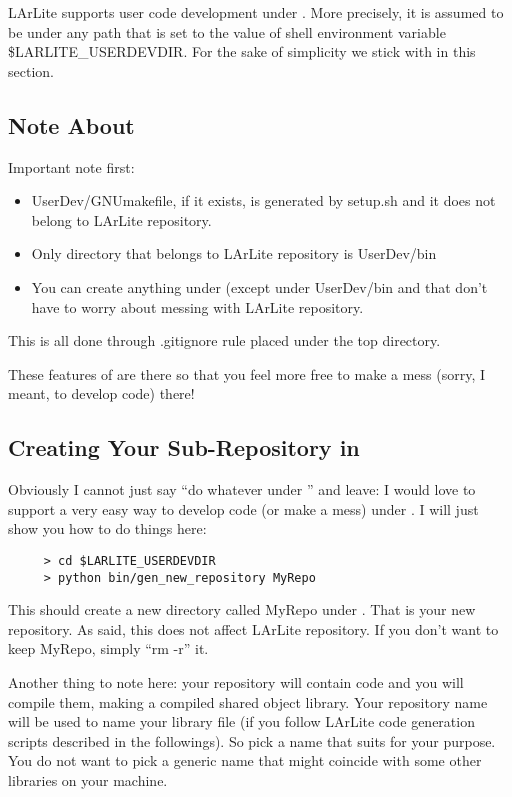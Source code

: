 
LArLite supports user code development under \UserDev.
More precisely, it is assumed to be under any path that is set to the value of shell environment variable {\ttfamily \$LARLITE\_USERDEVDIR}. 
For the sake of simplicity we stick with \UserDev in this section.

\subsection{Note About \UserDev}
Important note first:
\begin{itemize}
  \item {\ttfamily UserDev/GNUmakefile}, if it exists, is generated by setup.sh and it does not belong to LArLite repository.
  \item Only directory that belongs to LArLite repository is {\ttfamily UserDev/bin}
  \item You can create anything under \UserDev (except under {\ttfamily UserDev/bin} and that don't have to worry about messing with LArLite repository.
\end{itemize}
This is all done through {\ttfamily .gitignore} rule placed under the top directory. 

These features of \UserDev are there so that you feel more free to make a mess (sorry, I meant, to develop code) there!

\subsection{Creating Your Sub-Repository in \UserDev}
\label{sec:devrepo:makenew}
Obviously I cannot just say ``do whatever under \UserDev'' and leave: I would love to support a very easy way to develop code (or make a mess) under \UserDev. I will just show you how to do things here:
\begin{lstlisting}
     > cd $LARLITE_USERDEVDIR
     > python bin/gen_new_repository MyRepo
\end{lstlisting}
This should create a new directory called {\ttfamily MyRepo} under \UserDev. That is your new repository. As said, this does not affect LArLite repository. If you don't want to keep {\ttfamily MyRepo}, simply ``{\ttfamily rm -r}'' it.

Another thing to note here: your repository will contain code and you will compile them, making a compiled shared object library. Your repository name will be used to name your library file (if you follow LArLite code generation scripts described in the followings). So pick a name that suits for your purpose. You do not want to pick a generic name that might coincide with some other libraries on your machine.

